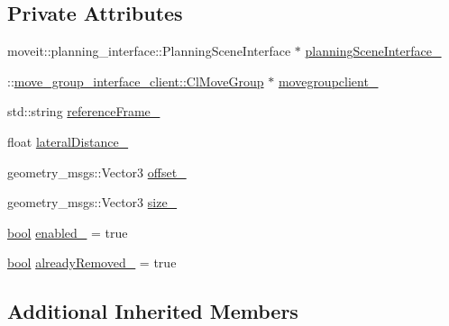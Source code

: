 \subsection*{Private Attributes}
\begin{DoxyCompactItemize}
\item 
moveit\+::planning\+\_\+interface\+::\+Planning\+Scene\+Interface $\ast$ \hyperlink{classsm__fetch__six__table__pick__n__sort__1_1_1move__group__interface__client_1_1CpConstraintLateralWorkspace_a58aa8daf72ad7b4363db32cf4dadec6c}{planning\+Scene\+Interface\+\_\+}
\item 
\+::\hyperlink{classmove__group__interface__client_1_1ClMoveGroup}{move\+\_\+group\+\_\+interface\+\_\+client\+::\+Cl\+Move\+Group} $\ast$ \hyperlink{classsm__fetch__six__table__pick__n__sort__1_1_1move__group__interface__client_1_1CpConstraintLateralWorkspace_afc42d1157c7c0be0e80c57c7ccd6211f}{movegroupclient\+\_\+}
\item 
std\+::string \hyperlink{classsm__fetch__six__table__pick__n__sort__1_1_1move__group__interface__client_1_1CpConstraintLateralWorkspace_a00a2521553405d97ad2ff89aefd777cf}{reference\+Frame\+\_\+}
\item 
float \hyperlink{classsm__fetch__six__table__pick__n__sort__1_1_1move__group__interface__client_1_1CpConstraintLateralWorkspace_adf1bc181cbcfc0e4d848754c70e436fc}{lateral\+Distance\+\_\+}
\item 
geometry\+\_\+msgs\+::\+Vector3 \hyperlink{classsm__fetch__six__table__pick__n__sort__1_1_1move__group__interface__client_1_1CpConstraintLateralWorkspace_ab39604f3fecbe836b1818bd72488527e}{offset\+\_\+}
\item 
geometry\+\_\+msgs\+::\+Vector3 \hyperlink{classsm__fetch__six__table__pick__n__sort__1_1_1move__group__interface__client_1_1CpConstraintLateralWorkspace_abcbeb3207f5e30503b9422654a3ec773}{size\+\_\+}
\item 
\hyperlink{classbool}{bool} \hyperlink{classsm__fetch__six__table__pick__n__sort__1_1_1move__group__interface__client_1_1CpConstraintLateralWorkspace_a1ccb3b3c9fc3456aa3e4e95849ff7ded}{enabled\+\_\+} = true
\item 
\hyperlink{classbool}{bool} \hyperlink{classsm__fetch__six__table__pick__n__sort__1_1_1move__group__interface__client_1_1CpConstraintLateralWorkspace_ad4f581ba97f45a7215d7cbb994d34825}{already\+Removed\+\_\+} = true
\end{DoxyCompactItemize}
\subsection*{Additional Inherited Members}


